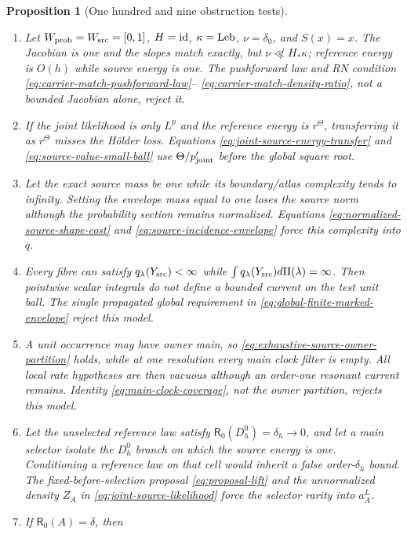 \documentclass[11pt]{article}
\newtheorem{proposition}[theorem]{Proposition}
\begin{document}
\begin{proposition}[One hundred and nine obstruction tests]
\begin{enumerate}[label=\textup{(T\arabic*)}]
\item Let $W_{\rm prob}=W_{\rm src}=[0,1]$, $H={\rm id}$,
      $\kappa={\rm Leb}$, $\nu=\delta_0$, and $S(x)=x$.  The Jacobian is one
      and the slopes match exactly, but
      $\nu\not\ll H_*\kappa$; reference energy is $O(h)$ while source energy
      is one.  The pushforward law and RN condition
      \eqref{eq:carrier-match-pushforward-law}--
      \eqref{eq:carrier-match-density-ratio}, not a bounded Jacobian alone,
      reject it.
\item If the joint likelihood is only $L^p$ and the reference energy is
      $r^\Theta$, transferring it as $r^\Theta$ misses the H\"older loss.
      Equations \eqref{eq:joint-source-energy-transfer} and
      \eqref{eq:source-value-small-ball} use
      $\Theta/p_{\rm joint}'$ before the global square root.
\item Let the exact source mass be one while its boundary/atlas complexity
      tends to infinity.  Setting the envelope mass equal to one loses the
      source norm although the probability section remains normalized.
      Equations \eqref{eq:normalized-source-shape-cost} and
      \eqref{eq:source-incidence-envelope} force this complexity into $q$.
\item Every fibre can satisfy $q_\lambda(Y_{\rm src})<\infty$ while
      $\int q_\lambda(Y_{\rm src})d\Pi(\lambda)=\infty$.  Then pointwise
      scalar integrals do not define a bounded current on the test unit ball.
      The single propagated global requirement in
      \eqref{eq:global-finite-marked-envelope} reject this model.
\item A unit occurrence may have owner main, so
      \eqref{eq:exhaustive-source-owner-partition} holds, while at one
      resolution every main clock filter is empty.  All local rate hypotheses
      are then vacuous although an order-one resonant current remains.
      Identity \eqref{eq:main-clock-coverage}, not the owner partition,
      rejects this model.
\item Let the unselected reference law satisfy
      $\mathsf R_0(D_h^0)=\delta_h\to0$, and let a main selector isolate the
      $D_h^0$ branch on which the source energy is one.  Conditioning a
      reference law on that cell would inherit a false order-$\delta_h$
      bound.  The fixed-before-selection proposal
      \eqref{eq:proposal-lift} and the unnormalized density $Z_A$ in
      \eqref{eq:joint-source-likelihood} force the selector rarity into
      $a_A^L$.
\item If $\mathsf R_0(A)=\delta$, then

\end{enumerate}
\end{proposition}
\end{document}
